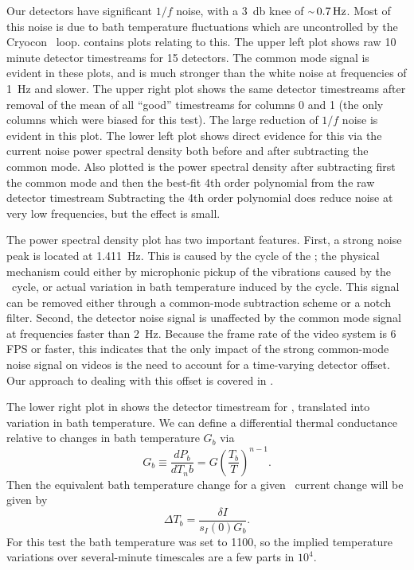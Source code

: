 
Our detectors have significant $1/f$ noise, with a \SI{3}{\decibel} knee of $\abt{\SI{0.7}{\hertz}}$.
Most of this noise is due to bath temperature fluctuations which are uncontrolled by the Cryocon \PID\ loop.
 contains plots relating to this.
The upper left plot shows raw 10 minute detector timestreams for 15 detectors.
The common mode signal is evident in these plots, and is much stronger than the white noise at frequencies of \SI{1}{\Hz} and slower.
The upper right plot shows the same detector timestreams after removal of the mean of all ``good'' timestreams for columns 0 and 1 (the only columns which were biased for this test).
The large reduction of $1/f$ noise is evident in this plot.
The lower left plot shows direct evidence for this via the current noise power spectral density both before and after subtracting the common mode.
Also plotted is the power spectral density after subtracting first the common mode and then the best-fit 4th order polynomial from the raw detector timestream
Subtracting the 4th order polynomial does reduce noise at very low frequencies, but the effect is small.

The power spectral density plot has two important features.
First, a strong noise peak is located at \SI{1.411}{\Hz}.
This is caused by the  cycle of the \PTC; the physical mechanism could either by microphonic pickup of the vibrations caused by the \PTC\ cycle, or actual variation in bath temperature induced by the cycle.
This signal can be removed either through a common-mode subtraction scheme or a notch filter.
Second, the detector noise signal is unaffected by the common mode signal at frequencies faster than \SI{2}{\Hz}.
Because the frame rate of the video system is 6 FPS or faster, this indicates that the only impact of the strong common-mode noise signal on videos is the need to account for a time-varying detector offset.
Our approach to dealing with this offset is covered in .

The lower right plot in  shows the detector timestream for , translated into variation in bath temperature.
We can define a differential thermal conductance relative to changes in bath temperature $G_b$ via
\begin{equation}
  G_b \equiv \frac{dP_b}{d T_nb} = G \left( \frac{T_b}{T} \right)^{n-1}.
\end{equation}
Then the equivalent bath temperature change for a given \TES\ current change will be given by
\begin{equation}
  \Delta T_b = \frac{\delta I}{s_I(0) G_b}.
\end{equation}
For this test the bath temperature was set to \SI{1100}{\mK}, so the implied temperature variations over several-minute timescales are a few parts in $10^{4}$.


